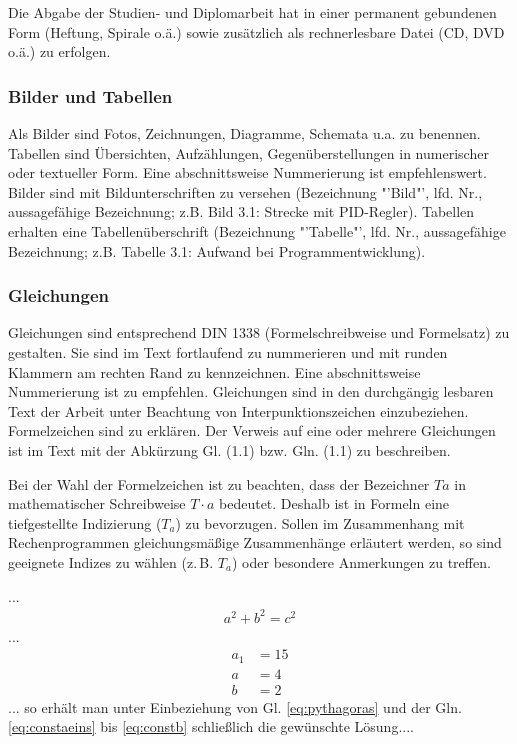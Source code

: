 Die Abgabe der Studien- und Diplomarbeit hat in einer permanent gebundenen Form
(Heftung, Spirale o.ä.) sowie zusätzlich als rechnerlesbare Datei (CD,
DVD o.ä.) zu erfolgen.


\subsubsection{Bilder und Tabellen}
\label{sec:BilderUndTabellen}

Als Bilder sind Fotos, Zeichnungen, Diagramme, Schemata u.a. zu benennen. Tabellen sind Übersichten, Aufzählungen, Gegenüberstellungen in numerischer oder textueller Form. Eine abschnittsweise Nummerierung ist empfehlenswert.
Bilder sind mit Bildunterschriften zu versehen (Bezeichnung "'Bild"', lfd. Nr., aussagefähige Bezeichnung; z.B. Bild 3.1: Strecke mit PID-Regler).
Tabellen erhalten eine Tabellenüberschrift (Bezeichnung "'Tabelle"', lfd. Nr., aussagefähige Bezeichnung; z.B. Tabelle 3.1: Aufwand bei Programmentwicklung).


\subsubsection{Gleichungen}
\label{sec:Gleichungen}

Gleichungen sind entsprechend DIN 1338 (Formelschreibweise und Formelsatz) zu gestalten. Sie sind im Text fortlaufend zu nummerieren und mit runden Klammern am rechten Rand zu kennzeichnen. Eine abschnittsweise Nummerierung ist zu empfehlen. Gleichungen sind in den durchgängig lesbaren Text der Arbeit unter Beachtung von Interpunktionszeichen einzubeziehen. Formelzeichen sind zu erklären. Der Verweis auf eine oder mehrere Gleichungen ist im Text mit der Abkürzung Gl. (1.1) bzw. Gln. (1.1) zu beschreiben.

Bei der Wahl der Formelzeichen ist zu beachten, dass der Bezeichner $Ta$ in mathematischer Schreibweise $T \cdot a$ bedeutet. Deshalb ist in Formeln eine tiefgestellte Indizierung ($T_a$) zu bevorzugen. Sollen im Zusammenhang mit Rechenprogrammen gleichungsmäßige Zusammenhänge erläutert werden, so sind geeignete Indizes zu wählen (z.\,B. $T_a$) oder besondere Anmerkungen zu treffen.



...
\begin{align}
  a^2 + b^2 = c^2 \label{eq:pythagoras}
\end{align}
...
\begin{align}
  a_1 &= 15 \label{eq:constaeins} \\
  a   &= 4  \label{eq:consta} \\
  b   &= 2  \label{eq:constb}
\end{align}
... so erhält man unter Einbeziehung von Gl. \eqref{eq:pythagoras} und der Gln. \eqref{eq:constaeins} bis \eqref{eq:constb} schließlich die gewünschte Lösung....

